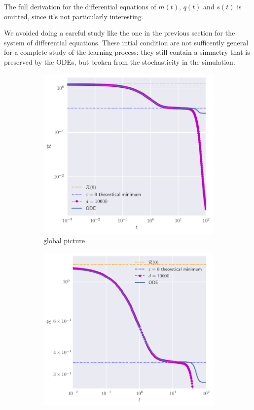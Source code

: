 The full derivation for the differential equations of \(m{(t)}\), \(q{(t)}\) and \(s{(t)}\) is 
omitted, since it's not particularly interesting. 

We avoided doing a careful study like the one in the previous section for the system of differential equations.
These intial condition are not sufficently general for a complete study of the learning process:
they still contain a simmetry that is preserved by the ODEs, but broken from the 
stochasticity in the simulation. 
\begin{figure}
  \centering
  \begin{subfigure}{0.495\textwidth}
    \includegraphics[width=1.\textwidth]{figures/example-small-eps.pdf}
    \caption{global picture}
  \end{subfigure}
  \begin{subfigure}{0.495\textwidth}
    \includegraphics[width=1.\textwidth]{figures/example-small-eps-zoomed.pdf}

\end{subfigure}
\end{figure}
